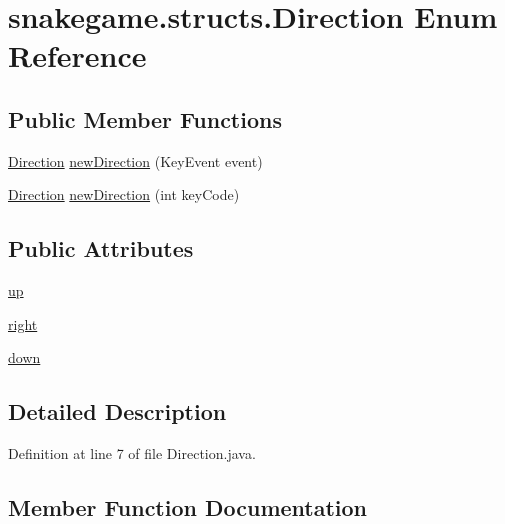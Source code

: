 \hypertarget{enumsnakegame_1_1structs_1_1_direction}{}\section{snakegame.\+structs.\+Direction Enum Reference}
\label{enumsnakegame_1_1structs_1_1_direction}
\subsection*{Public Member Functions}
\begin{DoxyCompactItemize}
\item 
\mbox{\hyperlink{enumsnakegame_1_1structs_1_1_direction}{Direction}} \mbox{\hyperlink{enumsnakegame_1_1structs_1_1_direction_a3f48c431df64ddc8d497746a14293fd7}{new\+Direction}} (Key\+Event event)
\item 
\mbox{\hyperlink{enumsnakegame_1_1structs_1_1_direction}{Direction}} \mbox{\hyperlink{enumsnakegame_1_1structs_1_1_direction_acca4af48b36042d85f1a9eab2becbf2a}{new\+Direction}} (int key\+Code)
\end{DoxyCompactItemize}
\subsection*{Public Attributes}
\begin{DoxyCompactItemize}
\item 
\mbox{\hyperlink{enumsnakegame_1_1structs_1_1_direction_a6eac992f122ba5b02aad12a7cfcf65ce}{up}}
\item 
\mbox{\hyperlink{enumsnakegame_1_1structs_1_1_direction_af5f078cc54af6fabd9325c39328c6d9c}{right}}
\item 
\mbox{\hyperlink{enumsnakegame_1_1structs_1_1_direction_ac1c479971b6ea1b25efe9d3eb82d1e46}{down}}
\end{DoxyCompactItemize}


\subsection{Detailed Description}


Definition at line 7 of file Direction.\+java.



\subsection{Member Function Documentation}
\mbox{\label{enumsnakegame_1_1structs_1_1_direction_a3f48c431df64ddc8d497746a14293fd7}} 
